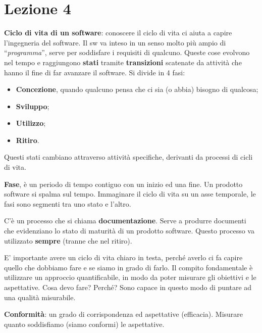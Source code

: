




\section{Lezione 4}

\textbf{Ciclo di vita di un software}: conoscere il ciclo di vita ci aiuta a capire l'ingegneria del software. Il sw va inteso in un senso molto più ampio di ``\textit{programma}'', serve per soddisfare i requisiti di qualcuno. Queste cose evolvono nel tempo e raggiungono \textbf{stati} tramite \textbf{transizioni} scatenate da attività che hanno il fine di far avanzare il software. Si divide in 4 fasi:

\begin{itemize}

	\item \textbf{Concezione}, quando qualcuno pensa che ci sia (o abbia) bisogno di qualcosa;
	\item \textbf{Sviluppo};
	\item \textbf{Utilizzo};
	\item \textbf{Ritiro}.

\end{itemize}

Questi stati cambiano attraverso attività specifiche, derivanti da processi di cicli di vita.

\textbf{Fase}, è un periodo di tempo contiguo con un inizio ed una fine. Un prodotto software si spalma sul tempo. Immaginare il ciclo di vita su un asse temporale, le fasi sono segmenti tra uno stato e l'altro.

C'è un processo che si chiama \textbf{documentazione}. Serve a produrre documenti che evidenziano lo stato di maturità di un prodotto software. Questo processo va utilizzato \textbf{sempre} (tranne che nel ritiro).

E' importante avere un ciclo di vita chiaro in testa, perché averlo ci fa capire quello che dobbiamo fare e se siamo in grado di farlo. Il compito fondamentale è utilizzare un approccio quantificabile, in modo da poter misurare gli obiettivi e le aspettative. Cosa devo fare? Perché? Sono capace in questo modo di puntare ad una qualità misurabile.

\textbf{Conformità}: un grado di corrispondenza ed aspettative (efficacia). Misurare quanto soddisfiamo (siamo conformi) le aspettative.

